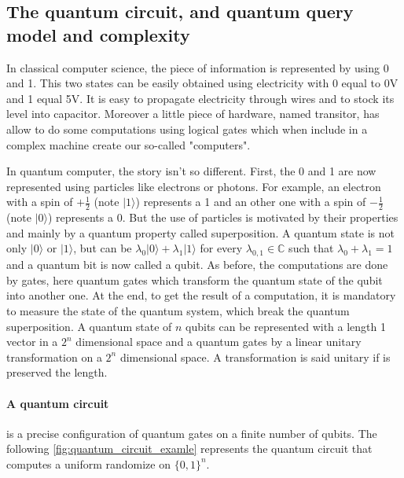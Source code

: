 \documentclass[11pt,a4paper]{article}
\newcommand{\ket}[1]{\ensuremath{|#1\rangle}}
\theoremstyle{definition}
\theoremstyle{plain}
\theoremstyle{definition}
\begin{document}
\subsection{The quantum circuit, and quantum query model and complexity}

In classical computer science, the piece of information is represented by using
0 and 1. This two states can be easily obtained using electricity with 0 equal to 0V
and 1 equal 5V. It is easy to propagate electricity through wires and to stock its
level into capacitor. Moreover a little piece of hardware, named transitor, has allow to do some
computations using logical gates which when include in a complex machine create our
so-called "computers".

In quantum computer, the story isn't so different. First, the 0 and 1 are
now represented using particles like electrons or photons. For example,
an electron with a spin of $+\frac{1}{2}$ (note \ket{1}) represents a 1 and
an other one with a spin of $-\frac{1}{2}$ (note \ket{0}) represents a 0.
But the use of particles is motivated by their properties and mainly by
a quantum property called superposition. A quantum state is not only \ket{0}
or \ket{1}, but can be $\lambda_0 \ket{0} + \lambda_1 \ket{1}$ for every
$\lambda_{0, 1} \in \mathbb{C}$ such that $\lambda_0+\lambda_1=1$ and a quantum
bit is now called a qubit. As before, the computations are done by gates, here
quantum gates which transform the quantum state of the qubit into another one.
At the end, to get the result of a computation, it is mandatory to measure the
state of the quantum system, which break the quantum superposition. A quantum
state of $n$ qubits can be represented with a length 1 vector in a $2^n$
dimensional space and a quantum gates by a linear unitary transformation
on a $2^n$ dimensional space. A transformation is said unitary if is preserved
the length.

\paragraph*{A quantum circuit} is a precise configuration of quantum gates
on a finite number of qubits. The following \autoref{fig:quantum_circuit_examle} represents the quantum
circuit that computes a uniform randomize on $\{0, 1\}^n$.
\end{document}
